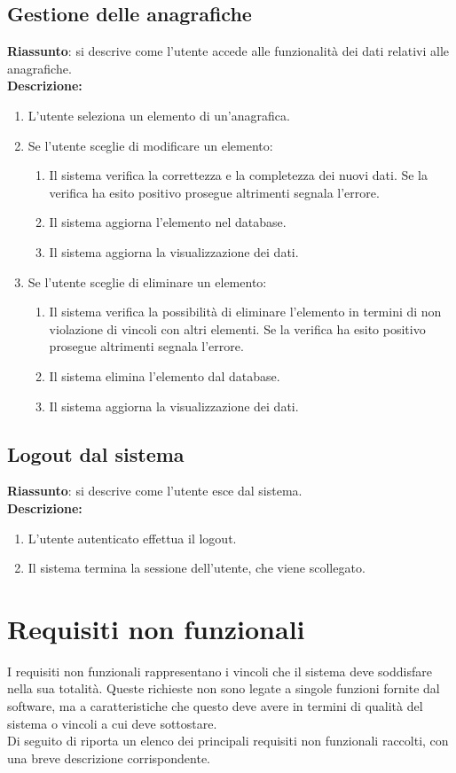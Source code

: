 \subsection{Gestione delle anagrafiche}
\textbf{Riassunto}: si descrive come l'utente accede alle funzionalità dei dati relativi alle anagrafiche.\\
\textbf{Descrizione:}
\begin{enumerate}
  \item L'utente seleziona un elemento di un'anagrafica.
  \item Se l'utente sceglie di modificare un elemento:
  \begin{enumerate}
    \item Il sistema verifica la correttezza e la completezza dei nuovi dati. Se la verifica ha esito positivo prosegue altrimenti segnala l'errore.
    \item Il sistema aggiorna l'elemento nel database.
    \item Il sistema aggiorna la visualizzazione dei dati.
  \end{enumerate}
  \item Se l'utente sceglie di eliminare un elemento:
  \begin{enumerate}
    \item Il sistema verifica la possibilità di eliminare l'elemento in termini di non violazione di vincoli con altri elementi. Se la verifica ha esito positivo prosegue altrimenti segnala l'errore.
    \item Il sistema elimina l'elemento dal database.
    \item Il sistema aggiorna la visualizzazione dei dati.
  \end{enumerate}
\end{enumerate}

\subsection{Logout dal sistema}
\textbf{Riassunto}: si descrive come l'utente esce dal sistema.\\
\textbf{Descrizione:}
\begin{enumerate}
  \item L'utente autenticato effettua il logout.
  \item Il sistema termina la sessione dell'utente, che viene scollegato.
\end{enumerate}



\section{Requisiti non funzionali}
\label{sec:nonfunzionali}
I requisiti non funzionali rappresentano i vincoli che il sistema deve soddisfare nella sua totalità. Queste richieste non sono legate a singole funzioni fornite dal software, ma a caratteristiche che questo deve avere in termini di qualità del sistema o vincoli a cui deve sottostare.\\
Di seguito di riporta un elenco dei principali requisiti non funzionali raccolti, con una breve descrizione corrispondente.

